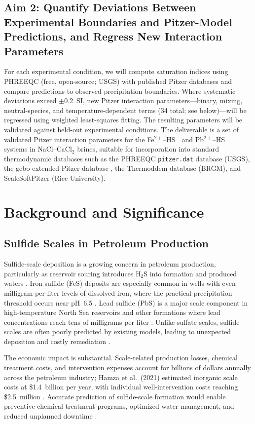 \documentclass[12pt]{article}
\begin{document}
\subsection{Aim 2: Quantify Deviations Between Experimental Boundaries and Pitzer-Model Predictions, and Regress New Interaction Parameters}

For each experimental condition, we will compute saturation indices using PHREEQC (free, open-source; USGS) with published Pitzer databases and compare predictions to observed precipitation boundaries. Where systematic deviations exceed $\pm$0.2~SI, new Pitzer interaction parameters---binary, mixing, neutral-species, and temperature-dependent terms (34 total; see below)---will be regressed using weighted least-squares fitting. The resulting parameters will be validated against held-out experimental conditions. The deliverable is a set of validated Pitzer interaction parameters for the Fe$^{2+}$--HS$^-$ and Pb$^{2+}$--HS$^-$ systems in NaCl--CaCl$_2$ brines, suitable for incorporation into standard thermodynamic databases such as the PHREEQC \texttt{pitzer.dat} database (USGS), the gebo extended Pitzer database \cite{bozau2013}, the Thermoddem database (BRGM), and ScaleSoftPitzer (Rice University).

\section{Background and Significance}

\subsection{Sulfide Scales in Petroleum Production}

Sulfide-scale deposition is a growing concern in petroleum production, particularly as reservoir souring introduces H$_2$S into formation and produced waters \cite{wylde2014,alharbi2017}. Iron sulfide (FeS) deposits are especially common in wells with even milligram-per-liter levels of dissolved iron, where the practical precipitation threshold occurs near pH~6.5 \cite{wylde2014}. Lead sulfide (PbS) is a major scale component in high-temperature North Sea reservoirs and other formations where lead concentrations reach tens of milligrams per liter \cite{alharbi2017,keogh2019}. Unlike sulfate scales, sulfide scales are often poorly predicted by existing models, leading to unexpected deposition and costly remediation \cite{wang2020}.

The economic impact is substantial. Scale-related production losses, chemical treatment costs, and intervention expenses account for billions of dollars annually across the petroleum industry; Hamza et al.\ (2021) estimated inorganic scale costs at \$1.4~billion per year, with individual well-intervention costs reaching \$2.5~million \cite{crabtree1999,kelland2014,hamza2021}. Accurate prediction of sulfide-scale formation would enable preventive chemical treatment programs, optimized water management, and reduced unplanned downtime \cite{kan2019,crabtree1999}.
\end{document}
